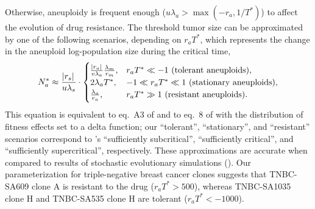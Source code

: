 \documentclass[12pt]{extarticle}
\renewcommand{\Delta}{r}
\begin{document}
Otherwise, aneuploidy is frequent enough ($u\lambda_a > \max{\left(-\Delta_a, 1/T^*\right)}$) to affect the evolution of drug resistance. 
The threshold tumor size can be approximated by one of the following scenarios, depending on $\Delta_a T^*$, which represents the change in the aneuploid log-population size during the critical time,
\begin{equation}  \label{eq:N_a}
\begin{aligned}
N_a^* \approx 
  \frac{\abs{\Delta_s}}{u\lambda_s} \cdot \begin{cases}
    \frac{\abs{\Delta_a}}{v\lambda_a}  \frac{\lambda_m}{\Delta_m} ,&
  \Delta_a T^* \ll -1 \text{ (tolerant aneuploids)},\\ 
  2\lambda_a T^* ,&
  -1 \ll \Delta_a T^* \ll 1  \text{ (stationary aneuploids)},\\ 
  \frac{\lambda_a}{\Delta_a} ,&
   \Delta_a T^* \gg 1 \text{ (resistant aneuploids)}.
  \end{cases}
\end{aligned}
\end{equation}
This equation is equivalent to eq.~A3 of \citet{iwasa2004evolutionary} and to eq.~8 of \citet{osmond_genetic_2020} with the distribution of fitness effects set to a delta function;
our ``tolerant'', ``stationary'', and ``resistant'' scenarios correspond to \citet{osmond_genetic_2020}'s ``sufficiently subcritical'', ``sufficiently critical'', and ``sufficiently supercritical'', respectively. %
These approximations are accurate when compared to results of stochastic evolutionary simulations (). 
Our parameterization for triple-negative breast cancer clones suggests that TNBC-SA609 clone A is resistant to the drug ($\Delta_a T^*>500$), whereas TNBC-SA1035 clone H and TNBC-SA535 clone H are tolerant ($\Delta_a T^*<-1000$).
\end{document}
